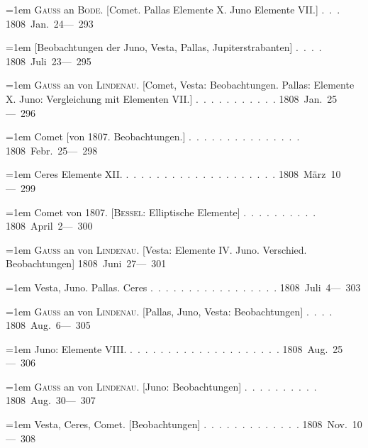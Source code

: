 \noindent\hangindent=1em \textsc{Gauss} an \textsc{Bode}. [Comet. Pallas Elemente X. Juno Elemente VII.] \mbox{.\ .\ .} \hfill\mbox{1808 Jan. 24}\quad\mbox{--- 293}\par\smallskip
\noindent\hangindent=1em \hspace{1em}[Beobachtungen der Juno, Vesta, Pallas, Jupiterstrabanten] \mbox{.\ .\ .\ .} \hfill\mbox{1808 Juli 23}\quad\mbox{--- 295}\par\smallskip
\noindent\hangindent=1em \textsc{Gauss} an von \textsc{Lindenau}. [Comet, Vesta: Beobachtungen. Pallas: Elemente X. Juno: Vergleichung mit Elementen VII.] \mbox{.\ .\ .\ .\ .\ .\ .\ .\ .\ .\ .} \hfill\mbox{1808 Jan. 25}\quad\mbox{--- 296}\par\smallskip
\noindent\hangindent=1em Comet [von 1807. Beobachtungen.] \mbox{.\ .\ .\ .\ .\ .\ .\ .\ .\ .\ .\ .\ .\ .\ .} \hfill\mbox{1808 Febr. 25}\quad\mbox{--- 298}\par\smallskip
\noindent\hangindent=1em Ceres Elemente XII. \mbox{.\ .\ .\ .\ .\ .\ .\ .\ .\ .\ .\ .\ .\ .\ .\ .\ .\ .\ .\ .} \hfill\mbox{1808 März 10\,}\quad\mbox{--- 299}\par\smallskip
\noindent\hangindent=1em Comet von 1807. [\textsc{Bessel}: Elliptische Elemente] \mbox{.\ .\ .\ .\ .\ .\ .\ .\ .\ .} \hfill\mbox{1808 April 2}\quad\mbox{--- 300}\par\smallskip
\noindent\hangindent=1em \textsc{Gauss} an von \textsc{Lindenau}. [Vesta: Elemente IV. Juno. Verschied. Beobachtungen] \hfill\mbox{1808 Juni 27}\quad\mbox{--- 301}\par\smallskip
\noindent\hangindent=1em Vesta, Juno. Pallas. Ceres \mbox{.\ .\ .\ .\ .\ .\ .\ .\ .\ .\ .\ .\ .\ .\ .\ .\ .} \hfill\mbox{1808 Juli 4}\quad\mbox{--- 303}\par\smallskip
\noindent\hangindent=1em \textsc{Gauss} an von \textsc{Lindenau}. [Pallas, Juno, Vesta: Beobachtungen] \mbox{.\ .\ .\ .} \hfill\mbox{1808 Aug. 6}\quad\mbox{--- 305}\par\smallskip
\noindent\hangindent=1em Juno: Elemente VIII. \mbox{.\ .\ .\ .\ .\ .\ .\ .\ .\ .\ .\ .\ .\ .\ .\ .\ .\ .\ .\ .} \hfill\mbox{1808 Aug. 25}\quad\mbox{--- 306}\par\smallskip
\noindent\hangindent=1em \textsc{Gauss} an von \textsc{Lindenau}. [Juno: Beobachtungen] \mbox{.\ .\ .\ .\ .\ .\ .\ .\ .\ .} \hfill\mbox{1808 Aug. 30}\quad\mbox{--- 307}\par\smallskip
\noindent\hangindent=1em Vesta, Ceres, Comet. [Beobachtungen] \mbox{.\ .\ .\ .\ .\ .\ .\ .\ .\ .\ .\ .\ .} \hfill\mbox{1808 Nov. 10}\quad\mbox{--- 308}\par\smallskip
